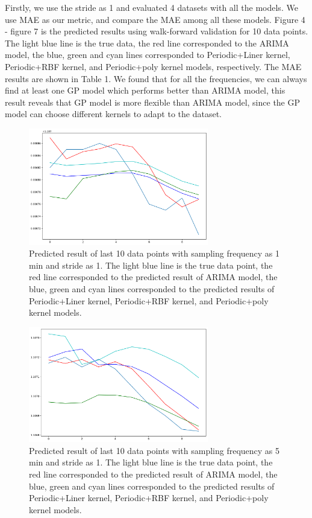 \documentclass[12pt]{article}
\begin{document}
Firstly, we use the stride as 1 and evaluated 4 datasets with all the models. We use MAE as our metric, and compare the MAE among all these models. Figure 4 - figure 7 is the predicted results using walk-forward validation for 10 data points. The light blue line is the true data, the red line corresponded to the ARIMA model, the blue, green and cyan lines corresponded to Periodic+Liner kernel, Periodic+RBF kernel, and Periodic+poly kernel models, respectively. The MAE results are shown in Table 1. We found that for all the frequencies, we can always find at least one GP model which performs better than ARIMA model, this result reveals that GP model is more flexible than ARIMA model, since the GP model can choose different kernels to adapt to the dataset.



\begin{figure}[H]
\centering 
\includegraphics[width=0.7\textwidth]{fig/section3/m1_h1_all_together.png}
\centering 
\caption{Predicted result of last 10 data points with sampling frequency as 1 min and stride as 1. The light blue line is the true data point, the red line corresponded to the predicted result of ARIMA model, the blue, green and cyan lines corresponded to the predicted results of Periodic+Liner kernel, Periodic+RBF kernel, and Periodic+poly kernel models. }
\label{fig:grammar}
\end{figure}

\begin{figure}[H]
\centering 
\includegraphics[width=0.7\textwidth]{fig/section3/m5_h1_all_together.png}
\centering 
\caption{Predicted result of last 10 data points with sampling frequency as 5 min and stride as 1. The light blue line is the true data point, the red line corresponded to the predicted result of ARIMA model, the blue, green and cyan lines corresponded to the predicted results of Periodic+Liner kernel, Periodic+RBF kernel, and Periodic+poly kernel models.}
\label{fig:grammar}
\end{figure}
\end{document}
